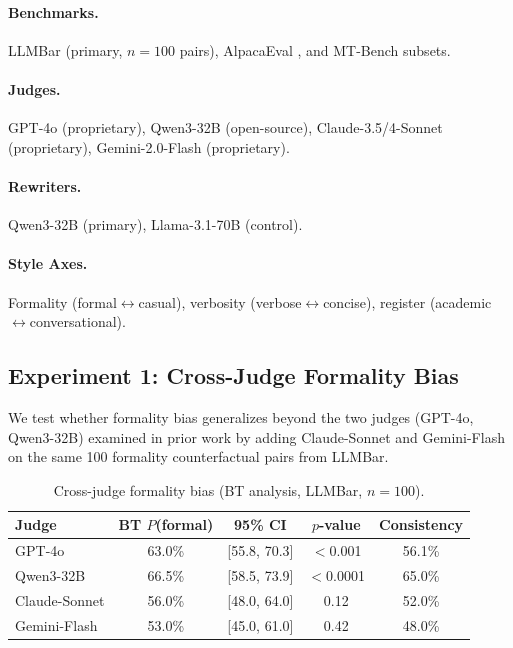 \documentclass[11pt,a4paper]{article}
\begin{document}
\paragraph{Benchmarks.} LLMBar \citep{llmbar2024} (primary, $n{=}100$ pairs), AlpacaEval \citep{alpacaeval2024}, and MT-Bench subsets.

\paragraph{Judges.} GPT-4o (proprietary), Qwen3-32B (open-source), Claude-3.5/4-Sonnet (proprietary), Gemini-2.0-Flash (proprietary).

\paragraph{Rewriters.} Qwen3-32B (primary), Llama-3.1-70B (control).

\paragraph{Style Axes.} Formality (formal$\leftrightarrow$casual), verbosity (verbose$\leftrightarrow$concise), register (academic$\leftrightarrow$conversational).

\subsection{Experiment 1: Cross-Judge Formality Bias}
\label{sec:cross-judge}

We test whether formality bias generalizes beyond the two judges (GPT-4o, Qwen3-32B) examined in prior work by adding Claude-Sonnet and Gemini-Flash on the same 100 formality counterfactual pairs from LLMBar.

\begin{table}[h]
\centering
\caption{Cross-judge formality bias (BT analysis, LLMBar, $n{=}100$).}
\label{tab:cross-judge}
\begin{tabular}{lcccc}
\toprule
\textbf{Judge} & \textbf{BT $P$(formal)} & \textbf{95\% CI} & \textbf{$p$-value} & \textbf{Consistency} \\
\midrule
GPT-4o & 63.0\% & [55.8, 70.3] & $<$0.001 & 56.1\% \\
Qwen3-32B & 66.5\% & [58.5, 73.9] & $<$0.0001 & 65.0\% \\
Claude-Sonnet & 56.0\% & [48.0, 64.0] & 0.12 & 52.0\% \\
Gemini-Flash & 53.0\% & [45.0, 61.0] & 0.42 & 48.0\% \\
\bottomrule
\end{tabular}
\end{table}
\end{document}

